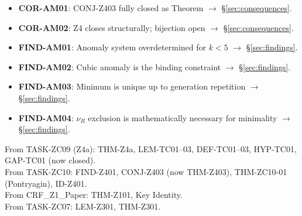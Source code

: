 \documentclass[12pt, a4paper]{article}
\begin{document}
\begin{formalbox}[title={Atomic units introduced by TASK-ZC09 (Z4b)}]
\begin{itemize}[leftmargin=*]
  \item \textbf{COR-AM01}: CONJ-Z403 fully closed as Theorem
    $\to$ \S\ref{sec:consequences}.
  \item \textbf{COR-AM02}: Z4 closes structurally; bijection open
    $\to$ \S\ref{sec:consequences}.
  \item \textbf{FIND-AM01}: Anomaly system overdetermined for $k < 5$
    $\to$ \S\ref{sec:findings}.
  \item \textbf{FIND-AM02}: Cubic anomaly is the binding constraint
    $\to$ \S\ref{sec:findings}.
  \item \textbf{FIND-AM03}: Minimum is unique up to generation repetition
    $\to$ \S\ref{sec:findings}.
  \item \textbf{FIND-AM04}: $\nu_R$ exclusion is mathematically necessary
    for minimality $\to$ \S\ref{sec:findings}.
\end{itemize}
\end{formalbox}

\begin{formalbox}[title={Atomic units inherited (not modified)}]
From TASK-ZC09 (Z4a): THM-Z4a, LEM-TC01--03, DEF-TC01--03,
  HYP-TC01, GAP-TC01 (now closed).\\
From TASK-ZC10: FIND-Z401, CONJ-Z403 (now THM-Z403),
  THM-ZC10-01 (Pontryagin), ID-Z401.\\
From CRF\_Z1\_Paper: THM-Z101, Key Identity. \\
From TASK-ZC07: LEM-Z301, THM-Z301.
\end{formalbox}
\end{document}
